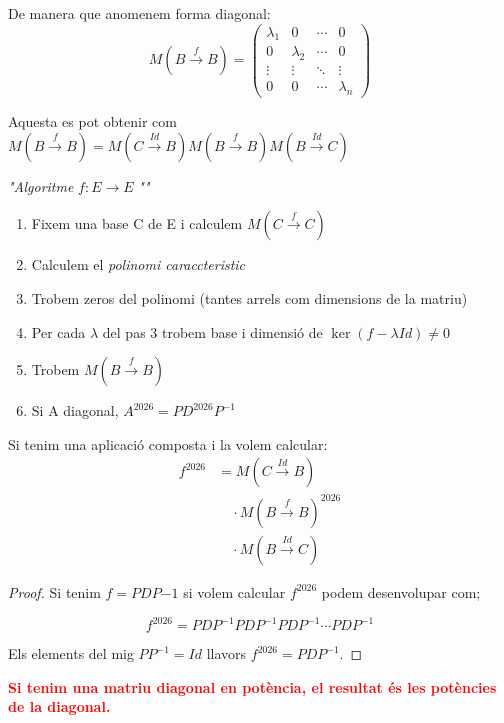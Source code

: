 \documentclass[12pt]{article}
\begin{document}
De manera que anomenem forma diagonal: \[
\boxed{
M(B\xrightarrow{f}B)=
\begin{pmatrix}
\lambda_1 & 0 & \cdots & 0\\
0 & \lambda_2 & \cdots & 0\\
\vdots & \vdots & \ddots & \vdots\\
0 & 0 & \cdots & \lambda_n
\end{pmatrix}
}
\]

Aquesta es pot obtenir com $M(B\xrightarrow{f}B) = M(C \xrightarrow{Id} B)M(B \xrightarrow{f} B)M(B \xrightarrow{Id} C)$

\noindent \textit{"Algoritme} $f: E\rightarrow E$ \textit{""}

 \begin{enumerate}
    \item Fixem una base C de E i calculem $M(C \xrightarrow{f} C)$
    \item Calculem el \textit{polinomi caraccteristic}
    \item Trobem zeros del polinomi (tantes arrels com dimensions de la matriu)
    \item Per cada $\lambda$ del pas 3 trobem base i dimensió de $\ker(f-\lambda Id) \neq 0$
    \item Trobem $M(B\xrightarrow{f}B)$
    \item Si A diagonal, $A^{2026} = PD^{2026}P^{-1}$
\end{enumerate}

Si tenim una aplicació composta i la volem calcular:
\[
\begin{aligned}
f^{2026} &= M(C \xrightarrow{Id} B)\\
&\quad\cdot M(B \xrightarrow{f} B)^{2026}\\
&\quad\cdot M(B \xrightarrow{Id} C)
\end{aligned}
\]

\begin{proof}
    Si tenim $f = PDP{-1}$ si volem calcular $f^{2026}$ podem desenvolupar com;

    \[f^{2026} = PDP^{-1}PDP^{-1}PDP^{-1}\cdots PDP^{-1}\]

    Els elements del mig $PP^{-1} = Id$ llavors $f^{2026} = PDP^{-1}$.
\end{proof}

\textcolor{red}{\textbf{Si tenim una matriu diagonal en potència, el resultat és les potències de la diagonal.}}
\end{document}
